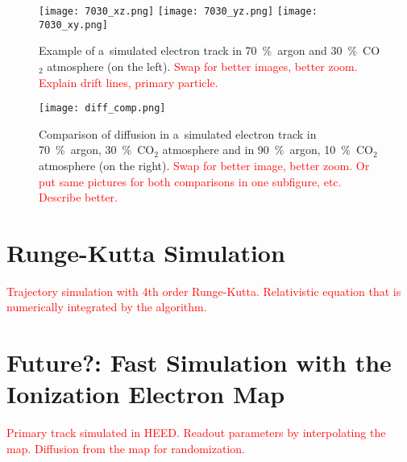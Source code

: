 		\begin{figure}
			\centering
			\texttt{[image: 7030\_xz.png]}
			\texttt{[image: 7030\_yz.png]}
			\texttt{[image: 7030\_xy.png]}
			\caption{Example of a~simulated electron track in 70~\%~argon and 30~\%~CO$_2$ atmosphere (on the left). \textcolor{red}{Swap for better images, better zoom. Explain drift lines, primary particle.}}
			\label{fig:7030sim}
		\end{figure}
		
		\begin{figure}
			\centering
			\texttt{[image: diff\_comp.png]}
			\caption{Comparison of diffusion in a~simulated electron track in 70~\%~argon, 30~\%~CO$_2$ atmosphere and in 90~\%~argon, 10~\%~CO$_2$ atmosphere (on the right). \textcolor{red}{Swap for better image, better zoom. Or put same pictures for both comparisons in one subfigure, etc. Describe better.}}
			\label{fig:diffcomp}
		\end{figure}
	
	\section{Runge-Kutta Simulation}
	\label{sec:rks}
		\textcolor{red}{Trajectory simulation with 4th order Runge-Kutta. Relativistic equation that is numerically integrated by the algorithm.}
	
	\section{Future?: Fast Simulation with the Ionization Electron Map}
		\textcolor{red}{Primary track simulated in HEED. Readout parameters by interpolating the map. Diffusion from the map for randomization.}